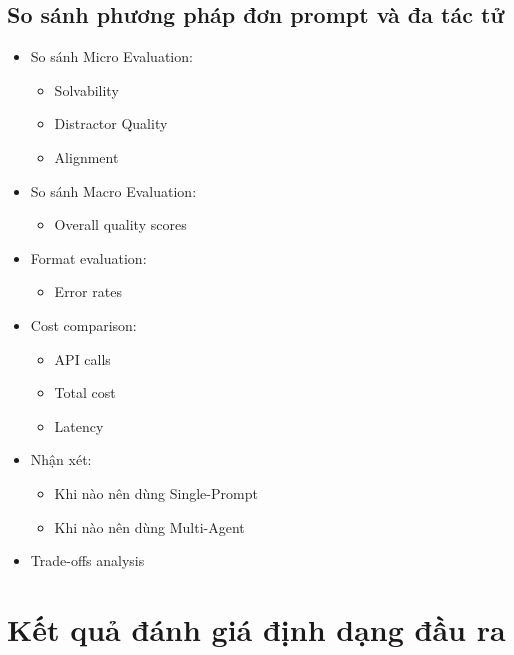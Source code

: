 \subsection{So sánh phương pháp đơn prompt và đa tác tử}
\begin{itemize}
    \item So sánh Micro Evaluation:
    \begin{itemize}
        \item Solvability
        \item Distractor Quality
        \item Alignment
    \end{itemize}
    \item So sánh Macro Evaluation:
    \begin{itemize}
        \item Overall quality scores
    \end{itemize}
    \item Format evaluation:
    \begin{itemize}
        \item Error rates
    \end{itemize}
    \item Cost comparison:
    \begin{itemize}
        \item API calls
        \item Total cost
        \item Latency
    \end{itemize}
    \item Nhận xét:
    \begin{itemize}
        \item Khi nào nên dùng Single-Prompt
        \item Khi nào nên dùng Multi-Agent
    \end{itemize}
    \item Trade-offs analysis
\end{itemize}

\section{Kết quả đánh giá định dạng đầu ra}

